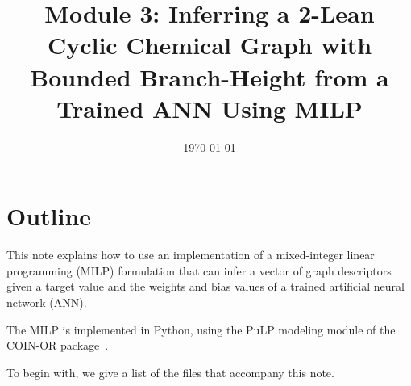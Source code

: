 \documentclass[11pt, titlepage, dvipdfmx, twoside]{article}
\title{\huge{Module 3: Inferring a 2-Lean Cyclic Chemical Graph with Bounded Branch-Height
			  from a Trained ANN Using MILP}}
\author{\project}
\begin{document}
\makeatletter 
\let\c@lstlisting\c@figure
\makeatother

\date{\today}

\maketitle


\thispagestyle{empty}
\tableofcontents
\clearpage



\section{Outline}
\label{sec:Intro}

This note explains how to use an implementation of a mixed-integer
linear programming (MILP) formulation that can infer
a vector of graph descriptors given a target value and the 
weights and bias values of a trained artificial neural network (ANN).

The MILP is implemented in Python, 
using the PuLP modeling module of the 
COIN-OR package~\cite{PuLP1,PuLP2,PuLP3,PuLP4}.

To begin with, we give a list of the files that accompany this note.
\end{document}
